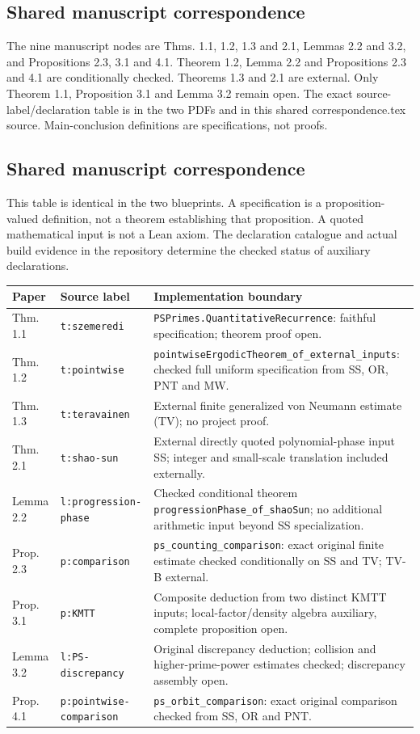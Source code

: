 \ifdefined\WebVersion
\subsection*{Shared manuscript correspondence}
The nine manuscript nodes are Thms. 1.1, 1.2, 1.3 and 2.1, Lemmas 2.2 and 3.2, and Propositions 2.3, 3.1 and 4.1. Theorem 1.2, Lemma 2.2 and Propositions 2.3 and 4.1 are conditionally checked. Theorems 1.3 and 2.1 are external. Only Theorem 1.1, Proposition 3.1 and Lemma 3.2 remain open. The exact source-label/declaration table is in the two PDFs and in this shared correspondence.tex source. Main-conclusion definitions are specifications, not proofs.
\else
\subsection*{Shared manuscript correspondence}
This table is identical in the two blueprints. A specification is a proposition-valued definition, not a theorem establishing that proposition. A quoted mathematical input is not a Lean axiom. The declaration catalogue and actual build evidence in the repository determine the checked status of auxiliary declarations.
\small
\begin{longtable}{@{}p{18mm}p{41mm}p{86mm}@{}}
\toprule Paper & Source label & Implementation boundary\\\midrule\endhead
Thm. 1.1 & \texttt{t:szemeredi} & \texttt{PSPrimes.QuantitativeRecurrence}: faithful specification; theorem proof open.\\
Thm. 1.2 & \texttt{t:pointwise} & \texttt{pointwiseErgodicTheorem\_of\_external\_inputs}: checked full uniform specification from SS, OR, PNT and MW.\\
Thm. 1.3 & \texttt{t:teravainen} & External finite generalized von Neumann estimate (TV); no project proof.\\
Thm. 2.1 & \texttt{t:shao-sun} & External directly quoted polynomial-phase input SS; integer and small-scale translation included externally.\\
Lemma 2.2 & \texttt{l:progression-phase} & Checked conditional theorem \texttt{progressionPhase\_of\_shaoSun}; no additional arithmetic input beyond SS specialization.\\
Prop. 2.3 & \texttt{p:comparison} & \texttt{ps\_counting\_comparison}: exact original finite estimate checked conditionally on SS and TV; TV-B external.\\
Prop. 3.1 & \texttt{p:KMTT} & Composite deduction from two distinct KMTT inputs; local-factor/density algebra auxiliary, complete proposition open.\\
Lemma 3.2 & \texttt{l:PS-discrepancy} & Original discrepancy deduction; collision and higher-prime-power estimates checked; discrepancy assembly open.\\
Prop. 4.1 & \texttt{p:pointwise-comparison} & \texttt{ps\_orbit\_comparison}: exact original comparison checked from SS, OR and PNT.\\
\bottomrule
\end{longtable}
